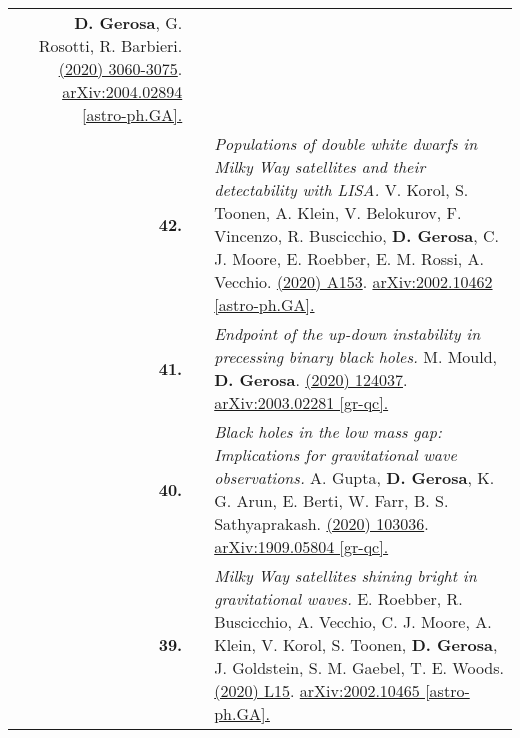 {\begin{longtable}{rp{0.3cm}p{15.8cm}}
\textbf{D. Gerosa}, G. Rosotti, R. Barbieri.
\newline{}
\href{https://doi.org/10.1093/mnras/staa1693}{\mnras 496 (2020) 3060-3075}. \href{https://arxiv.org/abs/2004.02894}{arXiv:2004.02894 [astro-ph.GA].}
\vspace{0.09cm}\\
%
\textbf{42.} & & \textit{Populations of double white dwarfs in Milky Way satellites and their detectability with LISA.}
\newline{}
V. Korol, S. Toonen, A. Klein, V. Belokurov, F. Vincenzo, R. Buscicchio, \textbf{D. Gerosa}, C. J. Moore, E. Roebber, E. M. Rossi, A. Vecchio.
\newline{}
\href{https://www.aanda.org/articles/aa/abs/2020/06/aa37764-20/aa37764-20.html}{\aap 638 (2020) A153}. \href{https://arxiv.org/abs/2002.10462}{arXiv:2002.10462 [astro-ph.GA].}
\vspace{0.09cm}\\
%
\textbf{41.} & & \textit{Endpoint of the up-down instability in precessing binary black holes.}
\newline{}
M. Mould, \textbf{D. Gerosa}.
\newline{}
\href{https://journals.aps.org/prd/abstract/10.1103/PhysRevD.101.124037}{\prd 101 (2020) 124037}. \href{https://arxiv.org/abs/2003.02281}{arXiv:2003.02281 [gr-qc].}
\vspace{0.09cm}\\
%
\textbf{40.} & & \textit{Black holes in the low mass gap: Implications for gravitational wave observations.}
\newline{}
A. Gupta, \textbf{D. Gerosa}, K. G. Arun, E. Berti, W. Farr, B. S. Sathyaprakash.
\newline{}
\href{https://journals.aps.org/prd/abstract/10.1103/PhysRevD.101.103036}{\prd 101 (2020) 103036}. \href{https://arxiv.org/abs/1909.05804}{arXiv:1909.05804 [gr-qc].}
\vspace{0.09cm}\\
%
\textbf{39.} & & \textit{Milky Way satellites shining bright in gravitational waves.}
\newline{}
E. Roebber, R. Buscicchio, A. Vecchio, C. J. Moore, A. Klein, V. Korol, S. Toonen, \textbf{D. Gerosa}, J. Goldstein, S. M. Gaebel, T. E. Woods.
\newline{}
\href{https://iopscience.iop.org/article/10.3847/2041-8213/ab8ac9}{\apjl 894 (2020) L15}. \href{https://arxiv.org/abs/2002.10465}{arXiv:2002.10465 [astro-ph.GA].}
\vspace{0.09cm}\\

\end{longtable}}
